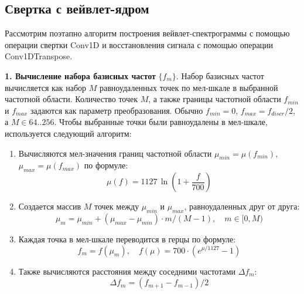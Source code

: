 \subsection{Свертка с вейвлет-ядром}

Рассмотрим поэтапно алгоритм построения вейвлет-спектрограммы с помощью операции свертки Conv1D и восстановления сигнала с помощью
операции Conv1DTranspose.

\textbf{1. Вычисление набора базисных частот} $\{f_m\}$. 
Набор базисных частот вычисляется как набор $M$ равноудаленных точек по мел-шкале в выбранной частотной области.
Количество точек $M$, а также границы частотной области $f_{min}$ и $f_{max}$ задаются как параметр преобразования. 
Обычно $f_{min} = 0$, $f_{max} = f_{discr} / 2$, а $M \in {64 .. 256}$.
Чтобы выбранные точки были равноудалены в мел-шкале, используется следующий алгоритм:
\begin{enumerate}[1.]
  \item Вычисляются мел-значения границ частотной области $\mu_{min} = \mu(f_{min})$, $\mu_{max} = \mu(f_{max})$ по формуле:
  \begin{equation}
    \mu(f) = 1127\,\ln(1 + \frac{f}{700})
  \end{equation}
  
  \item Создается массив $M$ точек между $\mu_{min}$ и $\mu_{max}$, равноудаленных друг от друга:
  \begin{equation}
    \mu_m = \mu_{min} + (\mu_{max} - \mu_{min}) \cdot m / (M - 1), \quad m \in [0, M)
  \end{equation}

  \item Каждая точка в мел-шкале переводится в герцы по формуле:
  \begin{equation}
    f_m = f(\mu_m), \quad f(\mu) = 700 \cdot (e^{\mu / 1127} - 1)
  \end{equation}

  \item Также вычисляются расстояния между соседними частотами $\Delta f_m$:
  \begin{equation}
    \Delta f_m = (f_{m+1} - f_{m-1}) / 2
  \end{equation}
\end{enumerate}

